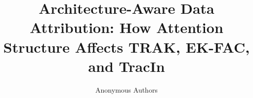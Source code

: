 \title{Architecture-Aware Data Attribution: How Attention Structure Affects TRAK, EK-FAC, and TracIn}

\author{Anonymous Authors}

\maketitle
